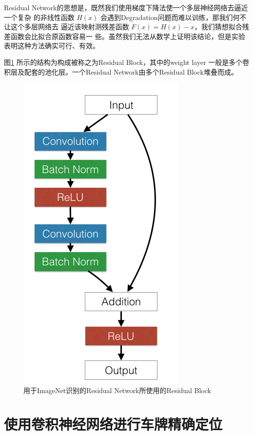 Residual Network的思想是，既然我们使用梯度下降法使一个多层神经网络去逼近一个复杂
的非线性函数 $H(x)$ 会遇到Degradation问题而难以训练，那我们何不让这个多层网络去
逼近该映射测残差函数 $F(x) = H(x) - x$，我们猜想拟合残差函数会比拟合原函数容易一
些。虽然我们无法从数学上证明该结论，但是实验表明这种方法确实可行、有效。

图\ref{Fig:ResBlockActual} 所示的结构为构成被称之为Residual Block，其中的weight layer
一般是多个卷积层及配套的池化层。一个Residual Network由多个Residual Block堆叠而成。

\begin{figure}
  \centering
  \includegraphics[height=0.5\textheight,
  keepaspectratio]{./Figure/ResBlockActual.png}
  \caption{用于ImageNet识别的Residual Network所使用的Residual
    Block}\label{Fig:ResBlockActual}
\end{figure}

\section{使用卷积神经网络进行车牌精确定位}

